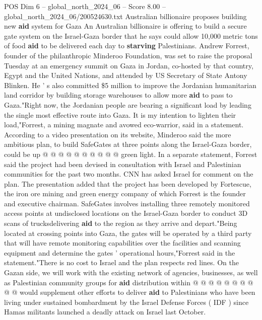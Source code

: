 \begin{textsample}{POS Dim 6 – global\_north\_2024\_06 – Score 8.00 – global\_north\_2024\_06/200524630.txt}  \label{ex:f6_pos_138}
Australian billionaire proposes building new \textbf{aid} system for Gaza An Australian billionaire is offering to build a secure gate system on the Israel-Gaza border that he says could allow 10,000 metric tons of food \textbf{aid} to be delivered each day to \textbf{starving} Palestinians.
Andrew Forrest, founder of the philanthropic Minderoo Foundation, was set to raise the proposal Tuesday at an emergency summit on Gaza in Jordan, co-hosted by that country, Egypt and the United Nations, and attended by US Secretary of State Antony Blinken.
He ' s also committed \$5 million to improve the Jordanian humanitarian land corridor by building storage warehouses to allow more \textbf{aid} to pass to Gaza."Right now, the Jordanian people are bearing a significant load by leading the single most effective route into Gaza.
It is my intention to lighten their load,"Forrest, a mining magnate and avowed eco-warrior, said in a statement.
According to a video presentation on its website, Minderoo said the more ambitious plan, to build SafeGates at three points along the Israel-Gaza border, could be up @ @ @ @ @ @ @ @ @ @ green light.
In a separate statement, Forrest said the project had been devised in consultation with Israel and Palestinian communities for the past two months.
CNN has asked Israel for comment on the plan.
The presentation added that the project has been developed by Fortescue, the iron ore mining and green energy company of which Forrest is the founder and executive chairman.
SafeGates involves installing three remotely monitored access points at undisclosed locations on the Israel-Gaza border to conduct 3D scans of trucksdelivering \textbf{aid} to the region as they arrive and depart."Being located at crossing points into Gaza, the gates will be operated by a third party that will have remote monitoring capabilities over the facilities and scanning equipment and determine the gates ' operational hours,"Forrest said in the statement."There is no cost to Israel and the plan respects red lines.
On the Gazan side, we will work with the existing network of agencies, businesses, as well as Palestinian community groups for \textbf{aid} distribution within @ @ @ @ @ @ @ @ @ @ would supplement other efforts to deliver \textbf{aid} to Palestinians who have been living under sustained bombardment by the Israel Defense Forces ( IDF ) since Hamas militants launched a deadly attack on Israel last October.

\end{textsample}
